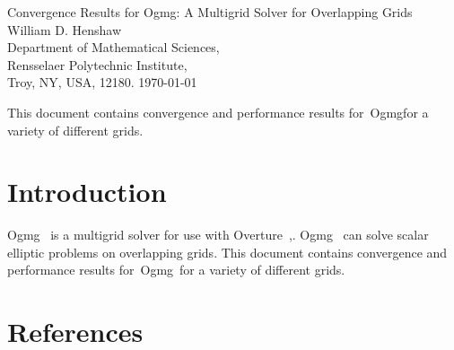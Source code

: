 \documentclass{article}
\begin{document}

\newcommand{\ogen}{\homeHenshaw/res/ogen}
\newcommand{\figures}{\homeHenshaw/Overture/docFigures}
\newcommand{\automg}{\homeHenshaw/papers/automg}
\newcommand{\ogmgDir}{\homeHenshaw/Overture/ogmg/doc}
\newcommand{\ogmgDocDir}{\homeHenshaw/Overture/ogmg/doc}

\newcommand{\Ogen}{{Ogen}}
\newcommand{\Overture}{{Overture}}
\newcommand{\Ogmg}{{Ogmg}}

\newcommand{\tablefontsize}{\footnotesize}
\newcommand{\clipfig}{}




\baselineskip
\begin{flushleft}
{\Large
  Convergence Results for Ogmg: A Multigrid Solver for Overlapping Grids\\
}
\vspace{2\baselineskip}
William D. Henshaw  \\
Department of Mathematical Sciences, \\
Rensselaer Polytechnic Institute, \\
Troy, NY, USA, 12180.
\vspace{\baselineskip}
\today\\
\vspace{\baselineskip}


\vspace{4\baselineskip}

This document contains convergence and performance results for~\Ogmg for a variety
of different grids.

\end{flushleft}

\clearpage
\tableofcontents



\clearpage
\section{Introduction}

\Ogmg~ is a multigrid solver for use with \Overture~\cite{overset96},\cite{OGES}.
\Ogmg~ can solve scalar elliptic problems
on overlapping grids. This document contains convergence and performance results for~\Ogmg\ for a variety
of different grids.






\clearpage
\section{References}




% 



\printindex
\end{document}
